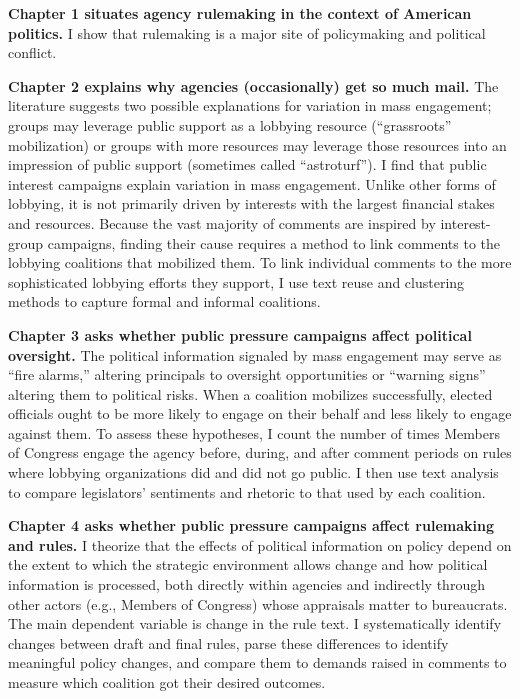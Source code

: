 \documentclass[
]{book}
\begin{document}
\textbf{Chapter 1 situates agency rulemaking in the context of American politics.} I show that rulemaking is a major site of policymaking and political conflict.

\textbf{Chapter 2 explains why agencies (occasionally) get so much mail.}
The literature suggests two possible explanations for variation in mass engagement; groups may leverage public support as a lobbying resource (``grassroots'' mobilization) or groups with more resources may leverage those resources into an impression of public support (sometimes called ``astroturf'').
I find that public interest campaigns explain variation in mass engagement. Unlike other forms of lobbying, it is not primarily driven by interests with the largest financial stakes and resources.
Because the vast majority of comments are inspired by interest-group campaigns, finding their cause requires a method to link comments to the lobbying coalitions that mobilized them. To link individual comments to the more sophisticated lobbying efforts they support, I use text reuse and clustering methods to capture formal and informal coalitions.

\textbf{Chapter 3 asks whether public pressure campaigns affect political oversight.} The political information signaled by mass engagement may serve as ``fire alarms,'' altering principals to oversight opportunities or ``warning signs'' altering them to political risks.
When a coalition mobilizes successfully,
elected officials ought to be more likely to engage on their behalf and less likely to engage against them.
To assess these hypotheses, I count the number of times Members of Congress engage the agency before, during, and after comment periods on rules where lobbying organizations did and did not go public. I then use text analysis to compare legislators' sentiments and rhetoric to that used by each coalition.

\textbf{Chapter 4 asks whether public pressure campaigns affect rulemaking and rules.}
I theorize that the effects of political information on policy depend on the extent to which the strategic environment allows change and how political information is processed, both directly within agencies and indirectly through other actors (e.g., Members of Congress) whose appraisals matter to bureaucrats.
The main dependent variable is change in the rule text.
I systematically identify changes between draft and final rules, parse these differences to identify meaningful policy changes, and compare them to demands raised in comments to measure which coalition got their desired outcomes.
\end{document}
